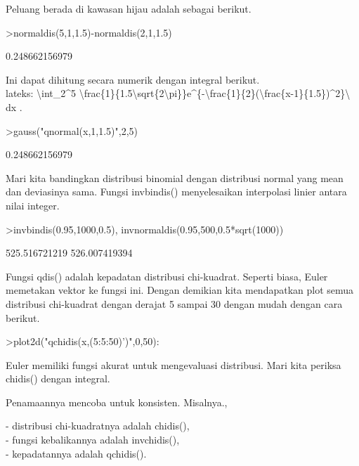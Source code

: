 \documentclass[a4paper,10pt]{article}
\begin{document}
\begin{eulernotebook}
\begin{eulercomment}
\begin{eulercomment}
\begin{eulercomment}
Peluang berada di kawasan hijau adalah sebagai berikut.
\end{eulercomment}
\begin{eulerprompt}
>normaldis(5,1,1.5)-normaldis(2,1,1.5)
\end{eulerprompt}
\begin{euleroutput}
  0.248662156979
\end{euleroutput}
\begin{eulercomment}
Ini dapat dihitung secara numerik dengan integral berikut.\\
lateks: \textbackslash{}int\_2\textasciicircum{}5
\textbackslash{}frac\{1\}\{1.5\textbackslash{}sqrt\{2\textbackslash{}pi\}\}e\textasciicircum{}\{-\textbackslash{}frac\{1\}\{2\}(\textbackslash{}frac\{x-1\}\{1.5\})\textasciicircum{}2\}\textbackslash{} dx .
\end{eulercomment}
\begin{eulerprompt}
>gauss("qnormal(x,1,1.5)",2,5)
\end{eulerprompt}
\begin{euleroutput}
  0.248662156979
\end{euleroutput}
\begin{eulercomment}
Mari kita bandingkan distribusi binomial dengan distribusi normal yang
mean dan deviasinya sama. Fungsi invbindis() menyelesaikan interpolasi
linier antara nilai integer.
\end{eulercomment}
\begin{eulerprompt}
>invbindis(0.95,1000,0.5), invnormaldis(0.95,500,0.5*sqrt(1000))
\end{eulerprompt}
\begin{euleroutput}
  525.516721219
  526.007419394
\end{euleroutput}
\begin{eulercomment}
Fungsi qdis() adalah kepadatan distribusi chi-kuadrat. Seperti biasa,
Euler memetakan vektor ke fungsi ini. Dengan demikian kita mendapatkan
plot semua distribusi chi-kuadrat dengan derajat 5 sampai 30 dengan
mudah dengan cara berikut.
\end{eulercomment}
\begin{eulerprompt}
>plot2d("qchidis(x,(5:5:50)')",0,50):
\end{eulerprompt}
\begin{eulercomment}
Euler memiliki fungsi akurat untuk mengevaluasi distribusi. Mari kita
periksa chidis() dengan integral.

Penamaannya mencoba untuk konsisten. Misalnya.,

- distribusi chi-kuadratnya adalah chidis(),\\
- fungsi kebalikannya adalah invchidis(),\\
- kepadatannya adalah qchidis().


\end{eulercomment}
\end{eulercomment}
\end{eulercomment}
\end{eulernotebook}
\end{document}
